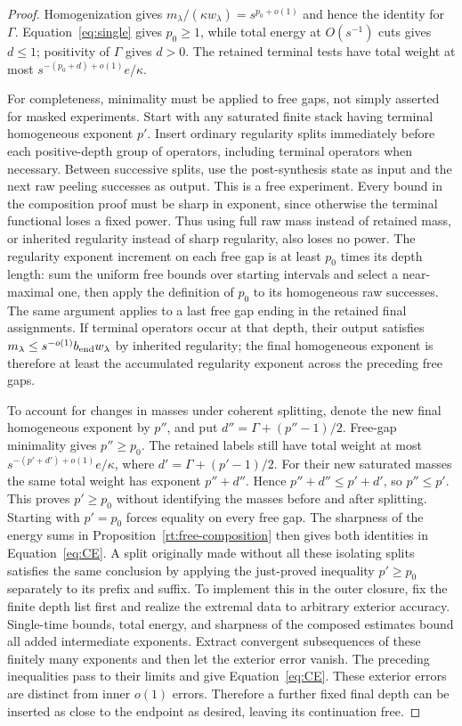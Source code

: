 \begin{proof}
Homogenization gives
$m_\lambda/(\kappa w_\lambda)=s^{p_0+o(1)}$ and hence the identity for
$\Gamma$.  Equation~\eqref{eq:single} gives $p_0\ge1$, while total
energy at $O(s^{-1})$ cuts gives $d\le1$; positivity of $\Gamma$ gives
$d>0$.  The retained terminal tests have total weight at most
$s^{-(p_0+d)+o(1)}e/\kappa$.

For completeness, minimality must be applied to free gaps, not simply
asserted for masked experiments.  Start with any saturated finite stack
having terminal homogeneous exponent $p'$.  Insert ordinary regularity
splits immediately before each positive-depth group of operators,
including terminal operators when necessary.  Between successive splits,
use the post-synthesis state as input and the next raw peeling successes
as output.  This is a free experiment.  Every bound in the composition
proof must be sharp in exponent, since otherwise the terminal functional
loses a fixed power.  Thus using full raw mass instead of retained mass,
or inherited regularity instead of sharp regularity, also loses no power.
The regularity exponent increment on each free gap is at least $p_0$
times its depth length: sum the uniform free bounds over starting
intervals and select a near-maximal one, then apply the definition of
$p_0$ to its homogeneous raw successes.  The same argument applies to a
last free gap ending in the retained final assignments.  If terminal
operators occur at that depth, their output satisfies
$m_\lambda\le s^{-o(1)}b_{\rm end}w_\lambda$ by inherited regularity;
the final homogeneous exponent is therefore at least the accumulated
regularity exponent across the preceding free gaps.

To account for changes in masses under coherent splitting, denote the
new final homogeneous exponent by $p''$, and put
$d''=\Gamma+(p''-1)/2$.  Free-gap minimality gives $p''\ge p_0$.
The retained labels still have total weight at most
$s^{-(p'+d')+o(1)}e/\kappa$, where $d'=\Gamma+(p'-1)/2$.
For their new saturated masses the same total weight has exponent
$p''+d''$.  Hence $p''+d''\le p'+d'$, so $p''\le p'$.
This proves $p'\ge p_0$ without identifying the masses before and after
splitting.  Starting with $p'=p_0$ forces equality on every free gap.
The sharpness of the energy sums in Proposition~\ref{rt:free-composition}
then gives both identities in Equation~\eqref{eq:CE}.  A split originally
made without all these isolating splits satisfies the same conclusion
by applying the just-proved inequality $p'\ge p_0$ separately to its
prefix and suffix.  To implement this in the outer closure, fix the
finite depth list first and realize the extremal data to arbitrary
exterior accuracy.  Single-time bounds, total energy, and sharpness of
the composed estimates bound all added intermediate exponents.
Extract convergent subsequences of these finitely many exponents and
then let the exterior error vanish.  The preceding inequalities pass
to their limits and give Equation~\eqref{eq:CE}.  These exterior errors
are distinct from inner $o(1)$ errors.  Therefore a further fixed final
depth can be inserted as
close to the endpoint as desired, leaving its continuation free.
\end{proof}

